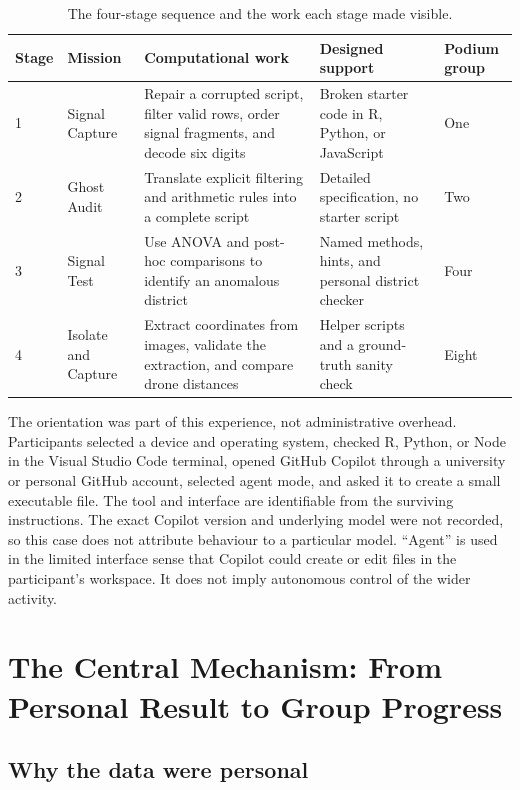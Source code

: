 \documentclass[11pt,a4paper]{article}
\begin{document}
\begin{table}[htbp]
\centering
\small
\caption{The four-stage sequence and the work each stage made visible.}
\label{tab:stages}
\begin{tabularx}{\textwidth}{@{}p{1.35cm}p{2.55cm}Xp{2.15cm}p{2.1cm}@{}}
\toprule
\textbf{Stage} & \textbf{Mission} & \textbf{Computational work} & \textbf{Designed support} & \textbf{Podium group} \\
\midrule
1 & Signal Capture & Repair a corrupted script, filter valid rows, order signal fragments, and decode six digits & Broken starter code in R, Python, or JavaScript & One \\
2 & Ghost Audit & Translate explicit filtering and arithmetic rules into a complete script & Detailed specification, no starter script & Two \\
3 & Signal Test & Use ANOVA and post-hoc comparisons to identify an anomalous district & Named methods, hints, and personal district checker & Four \\
4 & Isolate and Capture & Extract coordinates from images, validate the extraction, and compare drone distances & Helper scripts and a ground-truth sanity check & Eight \\
\bottomrule
\end{tabularx}
\end{table}

The orientation was part of this experience, not administrative overhead. Participants selected a device and operating system, checked R, Python, or Node in the Visual Studio Code terminal, opened GitHub Copilot through a university or personal GitHub account, selected agent mode, and asked it to create a small executable file. The tool and interface are identifiable from the surviving instructions. The exact Copilot version and underlying model were not recorded, so this case does not attribute behaviour to a particular model. ``Agent'' is used in the limited interface sense that Copilot could create or edit files in the participant's workspace. It does not imply autonomous control of the wider activity.

\section{The Central Mechanism: From Personal Result to Group Progress}

\subsection{Why the data were personal}
\end{document}
